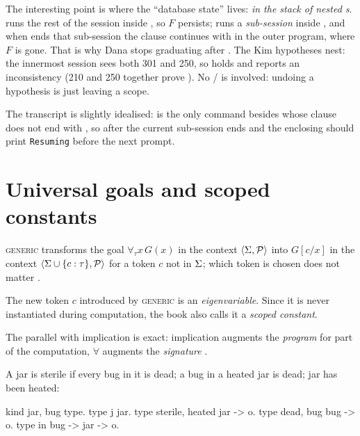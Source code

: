 {The interesting point is where the ``database state'' lives: \emph{in the stack of nested
s}.  runs the rest of the session inside , so $F$
persists;  runs a \emph{sub-session} inside , and when  ends that
sub-session the clause continues with  in the outer program, where $F$ is gone.
That is why Dana stops graduating after . The Kim hypotheses nest: the innermost session sees
both 301 and 250, so  holds and  reports an inconsistency (210 and 250 together
prove ). No / is involved: undoing a hypothesis is just leaving a scope.

\begin{remark}
The transcript is slightly idealised:  is the only command besides  whose clause
does not end with , so after  the current sub-session ends and the enclosing 
should print \texttt{Resuming} before the next prompt.
\end{remark}

\section{Universal goals and scoped constants}\label{sec:hh-generic}

\textsc{generic} transforms the goal $\forall_\tau x\,G(x)$ in the context $\langle\Sigma,\mathcal{P}\rangle$ into
$G[c/x]$ in the context $\langle\Sigma\cup\{c:\tau\},\mathcal{P}\rangle$ for a token $c$ not in $\Sigma$; which token
is chosen does not matter .

\begin{definition}\label{def:hh-eigen}
The new token $c$ introduced by \textsc{generic} is an \emph{eigenvariable}. Since it is never
instantiated during computation, the book also calls it a \emph{scoped constant}.
\end{definition}

The parallel with implication is exact: implication augments the \emph{program} for part of the
computation, $\forall$ augments the \emph{signature} .

\begin{tutorial}
A jar is sterile if every bug in it is dead; a bug in a heated jar is dead; jar  has been heated:
\begin{lprolog}
kind jar, bug        type.
type j               jar.
type sterile, heated jar -> o.
type dead, bug       bug -> o.
type in              bug -> jar -> o.


\end{lprolog}
\end{tutorial}}
